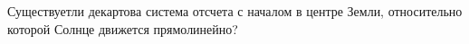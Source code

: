 Существуетли декартова система отсчета с началом в центре Земли,
относительно которой Солнце движется прямолинейно?
